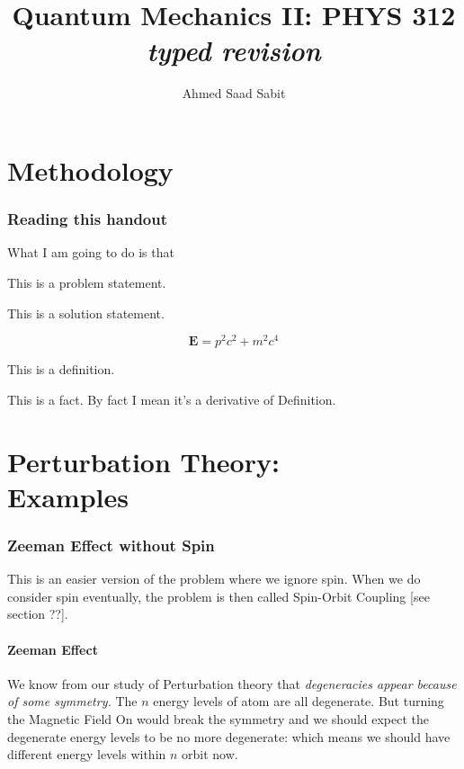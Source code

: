 \documentclass[10pt]{article}
\renewcommand{\vec}{\mathbf}
\begin{document}
	\title{{Quantum Mechanics II: PHYS 312}\\{\normalsize{\itshape 
				typed revision
	}}}
	\author{Ahmed Saad Sabit}
	\maketitle
	\newpage
	\pagestyle{fancynotes}

\part{Methodology}
\section{Reading this handout} 
What I am going to do is that
\begin{prob}
	This is a problem statement.
\end{prob}
\begin{solu}
	This is a solution statement. 
\end{solu}
\begin{margintable}
	\[
	\vec{E} = p^2 c^2 + m^2 c^{4}
	\] 
\end{margintable}
\begin{definition}
	This is a definition. 
\end{definition}
\begin{fact}
This is a fact. By fact I mean it's a derivative of Definition.
\end{fact}



\newpage
\part{Perturbation Theory: \\Examples} 
\section*{Zeeman Effect without Spin} 
This is an easier version of the problem where we ignore spin. When we do consider spin eventually, the problem is then called Spin-Orbit Coupling [see section ??]. 

\subsection*{Zeeman Effect} 
We know from our study of Perturbation theory that \emph{degeneracies appear because of some symmetry.} The $n$ energy levels of atom are all degenerate. But turning the Magnetic Field On would break the symmetry and we should expect the degenerate energy levels to be no more degenerate: which means we should have different energy levels within $n$ orbit now. 
\end{document}
